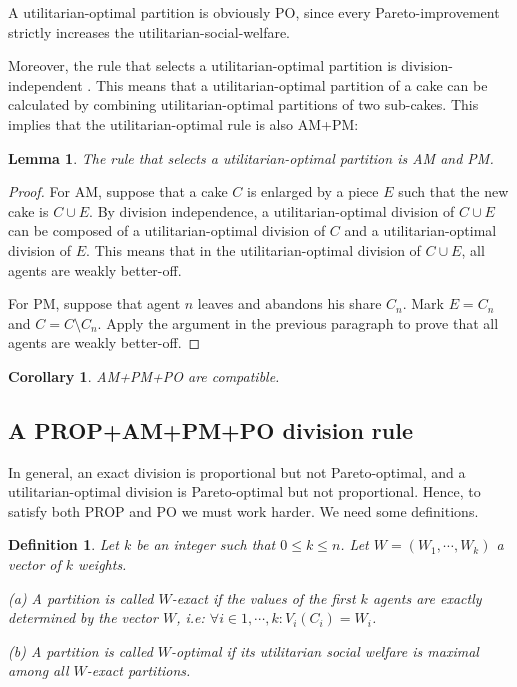 \documentclass[a4paper,12pt]{article}
\newtheorem{lemma}{Lemma}[section]
\newtheorem{cor}{Corollary}[section]
\newtheorem{defn}{Definition}[section]
\begin{document}
A utilitarian-optimal partition is obviously PO, since every Pareto-improvement strictly increases the utilitarian-social-welfare.

Moreover, the rule that selects a utilitarian-optimal partition is division-independent \cite{Chambers_2005}. This means that a utilitarian-optimal partition of a cake can be calculated by combining utilitarian-optimal partitions of two sub-cakes. This implies that the utilitarian-optimal rule is also AM+PM:

\begin{lemma}
\label{lemma:utilitarian-optimal-is-am-pm}
The rule that selects a utilitarian-optimal partition is AM and PM.
\end{lemma}
\begin{proof}
For AM, suppose that a cake $C$ is enlarged by a piece $E$ such that the new cake is $C\cup E$. By division independence, a utilitarian-optimal division of $C\cup E$ can be composed of a utilitarian-optimal division of $C$ and a utilitarian-optimal division of $E$. This means that in the utilitarian-optimal division of $C\cup E$, all agents are weakly better-off.

For PM, suppose that agent $n$ leaves and abandons his share $C_n$. Mark $E=C_n$ and $C=C\setminus C_n$. Apply the argument in the previous paragraph to prove that all agents are weakly better-off.
\end{proof}

\begin{cor}
AM+PM+PO are compatible.
\end{cor}



\subsection{A PROP+AM+PM+PO division rule}
In general, an exact division is proportional but not Pareto-optimal, and a utilitarian-optimal division is Pareto-optimal but not proportional. Hence, to satisfy both PROP and PO we must work harder. We need some definitions.

\begin{defn}
Let $k$ be an integer such that $0\leq k\leq n$. Let $W=(W_1,\cdots,W_k)$ a vector of $k$ weights.

(a) A partition is called \emph{$W$-exact} if the values of the first $k$ agents are exactly determined by the vector $W$, i.e: $\forall i\in 1,\cdots,k: V_i(C_i)=W_i$.

(b) A partition is called \emph{$W$-optimal} if its utilitarian social welfare is maximal among all \emph{$W$-exact} partitions.
\end{defn}
\end{document}
